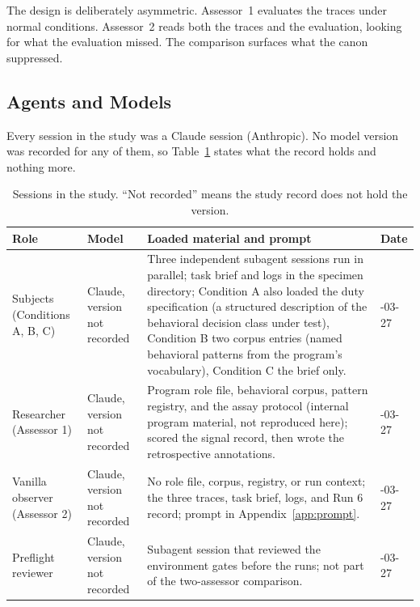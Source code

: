 \documentclass[11pt,a4paper]{article}
\begin{document}
The design is deliberately asymmetric. Assessor~1 evaluates the traces under
normal conditions. Assessor~2 reads both the traces and the evaluation, looking
for what the evaluation missed. The comparison surfaces what the canon
suppressed.

\subsection{Agents and Models}
\label{sec:agents}

Every session in the study was a Claude session (Anthropic). No model version
was recorded for any of them, so Table~\ref{tab:agents} states what the record
holds and nothing more.

\begin{table}[h]
\centering
\small
\caption{Sessions in the study. ``Not recorded'' means the study record does
  not hold the version.}
\label{tab:agents}
\begin{tabular}{@{}>{\raggedright\arraybackslash}p{3.6cm}>{\raggedright\arraybackslash}p{2.6cm}>{\raggedright\arraybackslash}p{6.2cm}>{\raggedright\arraybackslash}p{2.1cm}@{}}
\toprule
Role & Model & Loaded material and prompt & Date \\
\midrule
Subjects (Conditions A, B, C) & Claude, version not recorded & Three independent subagent sessions run in parallel; task brief and logs in the specimen directory; Condition A also loaded the duty specification (a structured description of the behavioral decision class under test), Condition B two corpus entries (named behavioral patterns from the program's vocabulary), Condition C the brief only. & 2026-03-27 \\
Researcher (Assessor 1) & Claude, version not recorded & Program role file, behavioral corpus, pattern registry, and the assay protocol (internal program material, not reproduced here); scored the signal record, then wrote the retrospective annotations. & 2026-03-27 \\
Vanilla observer (Assessor 2) & Claude, version not recorded & No role file, corpus, registry, or run context; the three traces, task brief, logs, and Run 6 record; prompt in Appendix~\ref{app:prompt}. & 2026-03-27 \\
Preflight reviewer & Claude, version not recorded & Subagent session that reviewed the environment gates before the runs; not part of the two-assessor comparison. & 2026-03-27 \\
\bottomrule
\end{tabular}
\end{table}
\end{document}
